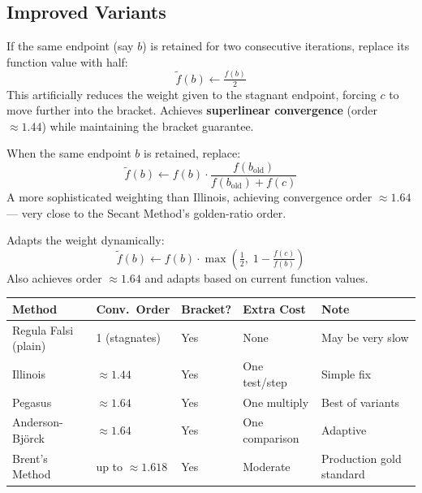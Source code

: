 \documentclass[12pt]{article}
\newcommand{\hcell}[1]{\textbf{\color{white}#1}}
\begin{document}
\subsection*{Improved Variants}

\begin{defbox}
If the same endpoint (say $b$) is retained for two consecutive iterations, replace its function value with half:
\[
  \tilde{f}(b) \leftarrow \tfrac{f(b)}{2}
\]
This artificially reduces the weight given to the stagnant endpoint, forcing $c$ to move further into the bracket. Achieves \textbf{superlinear convergence} (order $\approx 1.44$) while maintaining the bracket guarantee.
\end{defbox}

\begin{defbox}
When the same endpoint $b$ is retained, replace:
\[
  \tilde{f}(b) \leftarrow f(b)\cdot\frac{f(b_\text{old})}{f(b_\text{old})+f(c)}
\]
A more sophisticated weighting than Illinois, achieving convergence order $\approx 1.64$ — very close to the Secant Method's golden-ratio order.
\end{defbox}

\begin{defbox}
Adapts the weight dynamically:
\[
  \tilde{f}(b) \leftarrow f(b)\cdot\max\!\left(\tfrac{1}{2},\;1-\tfrac{f(c)}{f(b)}\right)
\]
Also achieves order $\approx 1.64$ and adapts based on current function values.
\end{defbox}

\begin{center}{\footnotesize\setlength{\tabcolsep}{4pt}
\begin{tabular}{p{3.5cm} C{2.2cm} C{2.4cm} C{2.4cm} C{2.8cm}}
\toprule
{}
\hcell{Method} & \hcell{Conv.\ Order} & \hcell{Bracket?} & \hcell{Extra Cost} & \hcell{Note} \\
\midrule
{}
Regula Falsi (plain) & 1 (stagnates) & Yes & None & May be very slow \\
Illinois & $\approx 1.44$ & Yes & One test/step & Simple fix \\
Pegasus & $\approx 1.64$ & Yes & One multiply & Best of variants \\
Anderson-Björck & $\approx 1.64$ & Yes & One comparison & Adaptive \\
Brent's Method & up to $\approx 1.618$ & Yes & Moderate & Production gold standard \\
\bottomrule
\end{tabular}
}\end{center}
\end{document}
